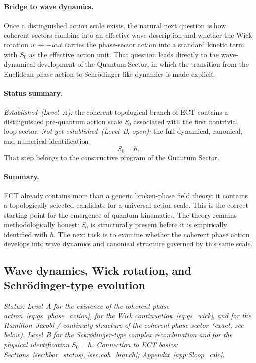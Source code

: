 \paragraph{Bridge to wave dynamics.}
Once a distinguished action scale exists, the natural next question is
how coherent sectors combine into an effective wave description and
whether the Wick rotation $w\to -ic_*t$ carries the phase-sector
action into a standard kinetic term with $S_0$ as the effective
action unit.
That question leads directly to the wave-dynamical development of the
Quantum Sector, in which the transition from the Euclidean phase action
to Schr\"odinger-like dynamics is made explicit.

\paragraph{Status summary.}
\textit{Established~(Level~A):}
the coherent-topological branch of ECT contains a distinguished
pre-quantum action scale $S_0$ associated with the first nontrivial
loop sector.
\textit{Not yet established~(Level~B, open):}
the full dynamical, canonical, and numerical identification
\begin{equation}
  S_0 = \hbar .
  \label{eq:qs_S0_identification}
\end{equation}
That step belongs to the constructive program of the Quantum Sector.

\paragraph{Summary.}
ECT already contains more than a generic broken-phase field theory:
it contains a topologically selected candidate for a universal action
scale.
This is the correct starting point for the emergence of quantum
kinematics.
The theory remains methodologically honest: $S_0$ is structurally
present before it is empirically identified with $\hbar$.
The next task is to examine whether the coherent phase action develops
into wave dynamics and canonical structure governed by this same scale.

\subsection{Wave dynamics, Wick rotation, and
  Schr\"odinger-type evolution}
\label{sec:qs_wave}

\textit{Status: Level~A for the existence of the coherent phase
action~\eqref{eq:qs_phase_action}, for the Wick
continuation~\eqref{eq:qs_wick}, and for the Hamilton--Jacobi /
continuity structure of the coherent phase sector~(exact, see below).
Level~B for the Schr\"odinger-type complex recombination and for the
physical identification $S_0=\hbar$.
Connection to ECT basics: Sections~\ref{sec:hbar_status},
\ref{sec:coh_branch}; Appendix~\ref{app:Sloop_calc}.}

